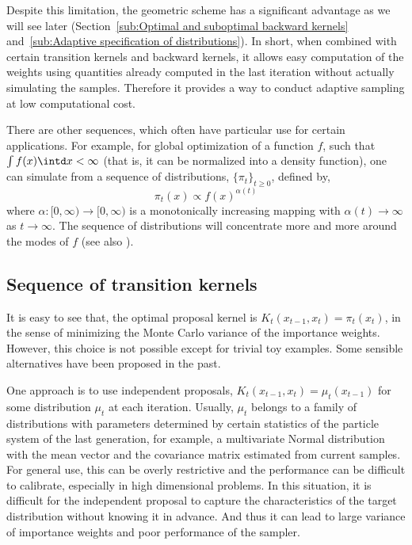 Despite this limitation, the geometric scheme has a significant advantage as
we will see later (Section~\ref{sub:Optimal and suboptimal backward kernels}
and~\ref{sub:Adaptive specification of distributions}). In short, when
combined with certain transition kernels and backward kernels, it allows easy
computation of the weights using quantities already computed in the last
iteration without actually simulating the samples. Therefore it provides a way
to conduct adaptive sampling at low computational cost.

There are other sequences, which often have particular use for certain
applications. For example, for global optimization of a function $f$, such
that $\int f(x)\intd x <\infty$ (that is, it can be normalized into a density
function), one can simulate from a sequence of distributions,
$\{\pi_t\}_{t\ge0}$, defined by,
\begin{equation}
  \pi_t(x) \propto f(x)^{\alpha(t)}
\end{equation}
where $\alpha:[0,\infty)\to[0,\infty)$ is a monotonically increasing mapping
with $\alpha(t)\to\infty$ as $t\to\infty$. The sequence of distributions will
concentrate more and more around the modes of $f$ (see also
\cite{Marinari:1992vx}).

\subsection{Sequence of transition kernels}
\label{sub:Sequence of transition kernels}

It is easy to see that, the optimal proposal kernel is $K_t(x_{t-1}, x_t) =
\pi_t(x_t)$, in the sense of minimizing the Monte Carlo variance of the
importance weights. However, this choice is not possible except for trivial
toy examples. Some sensible alternatives have been proposed in the past.

One approach is to use independent proposals, $K_t(x_{t-1},x_t) =
\mu_t(x_{t-1})$ for some distribution $\mu_t$ at each iteration. Usually,
$\mu_t$ belongs to a family of distributions with parameters determined by
certain statistics of the particle system of the last generation, for example,
a multivariate Normal distribution with the mean vector and the covariance
matrix estimated from current samples. For general use, this can be overly
restrictive and the performance can be difficult to calibrate, especially in
high dimensional problems. In this situation, it is difficult for the
independent proposal to capture the characteristics of the target distribution
without knowing it in advance. And thus it can lead to large variance of
importance weights and poor performance of the sampler.


